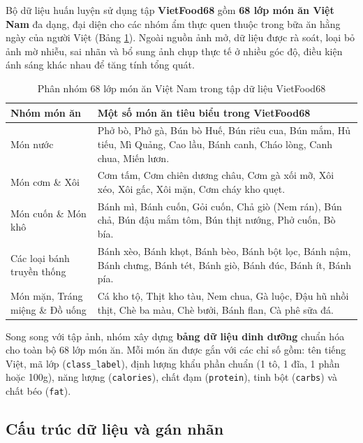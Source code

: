 \documentclass[../main.tex]{subfiles}
\begin{document}
Bộ dữ liệu huấn luyện sử dụng tập \textbf{VietFood68} gồm \textbf{68 lớp món ăn Việt Nam} đa dạng, đại diện cho các nhóm ẩm thực quen thuộc trong bữa ăn hằng ngày của người Việt (Bảng \ref{tab:ch2_vietfood68_groups}). Ngoài nguồn ảnh mở, dữ liệu được rà soát, loại bỏ ảnh mờ nhiễu, sai nhãn và bổ sung ảnh chụp thực tế ở nhiều góc độ, điều kiện ánh sáng khác nhau để tăng tính tổng quát.

\begin{table}[H]
    \centering
    \caption{Phân nhóm 68 lớp món ăn Việt Nam trong tập dữ liệu VietFood68}
    \label{tab:ch2_vietfood68_groups}
    \begin{tabular}{|p{}|p{}|}
        \hline
        \rowcolor{primary!35}
        \textbf{Nhóm món ăn} & \textbf{Một số món ăn tiêu biểu trong VietFood68} \\
        \hline
        Món nước & Phở bò, Phở gà, Bún bò Huế, Bún riêu cua, Bún mắm, Hủ tiếu, Mì Quảng, Cao lầu, Bánh canh, Cháo lòng, Canh chua, Miến lươn. \\
        \hline
        Món cơm \& Xôi & Cơm tấm, Cơm chiên dương châu, Cơm gà xối mỡ, Xôi xéo, Xôi gấc, Xôi mặn, Cơm cháy kho quẹt. \\
        \hline
        Món cuốn \& Món khô & Bánh mì, Bánh cuốn, Gỏi cuốn, Chả giò (Nem rán), Bún chả, Bún đậu mắm tôm, Bún thịt nướng, Phở cuốn, Bò bía. \\
        \hline
        Các loại bánh truyền thống & Bánh xèo, Bánh khọt, Bánh bèo, Bánh bột lọc, Bánh nậm, Bánh chưng, Bánh tét, Bánh giò, Bánh đúc, Bánh ít, Bánh pía. \\
        \hline
        Món mặn, Tráng miệng \& Đồ uống & Cá kho tộ, Thịt kho tàu, Nem chua, Gà luộc, Đậu hũ nhồi thịt, Chè ba màu, Chè bưởi, Bánh flan, Cà phê sữa đá. \\
        \hline
    \end{tabular}
\end{table}

Song song với tập ảnh, nhóm xây dựng \textbf{bảng dữ liệu dinh dưỡng} chuẩn hóa cho toàn bộ 68 lớp món ăn. Mỗi món ăn được gắn với các chỉ số gồm: tên tiếng Việt, mã lớp (\texttt{class\_label}), định lượng khẩu phần chuẩn (1 tô, 1 đĩa, 1 phần hoặc 100g), năng lượng (\texttt{calories}), chất đạm (\texttt{protein}), tinh bột (\texttt{carbs}) và chất béo (\texttt{fat}).

\subsection{Cấu trúc dữ liệu và gán nhãn}
\end{document}

